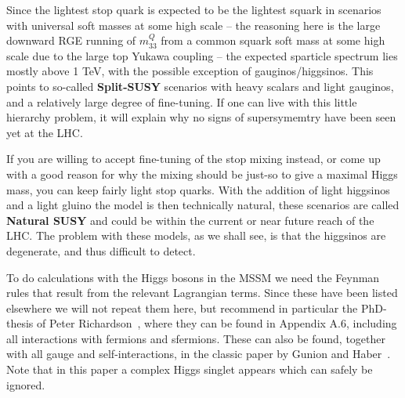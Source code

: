 \documentclass[notes.tex]{subfiles}
\begin{document}
Since the lightest stop quark is expected to be the lightest squark in scenarios with universal soft masses at some high scale -- the reasoning here is the large downward RGE running of $m_{33}^Q$ from a common squark soft mass at some high scale due to the large top Yukawa coupling -- the expected sparticle spectrum lies mostly above 1 TeV, with the possible exception of gauginos/higgsinos. This points to so-called {\bf Split-SUSY} scenarios with heavy scalars and light gauginos, and a relatively large degree of fine-tuning. If one can live with this little hierarchy problem, it will explain why no signs of supersymemtry have been seen yet at the LHC. 

If you are willing to accept fine-tuning of the stop mixing instead, or come up with a good reason for why the mixing should be just-so to give a maximal Higgs mass, you can keep fairly light stop quarks. With the addition of light higgsinos and a light gluino the model is then technically natural, these scenarios are called {\bf Natural SUSY} and could be within the current or near future reach of the LHC. The problem with these models, as we shall see, is that the higgsinos are degenerate, and thus difficult to detect.


To do calculations with the Higgs bosons in the MSSM we need the Feynman rules that result from the relevant Lagrangian terms. Since these have been listed elsewhere we will not repeat them here, but recommend in particular the PhD-thesis of Peter Richardson~\cite{Richardson:2000nt}, where they can be found in Appendix A.6, including all interactions with fermions and sfermions. These can also be found, together with all gauge and self-interactions, in the classic paper by Gunion and Haber~\cite{Gunion:1984yn}. Note that in this paper a complex Higgs singlet appears which can safely be ignored.


\end{document}
